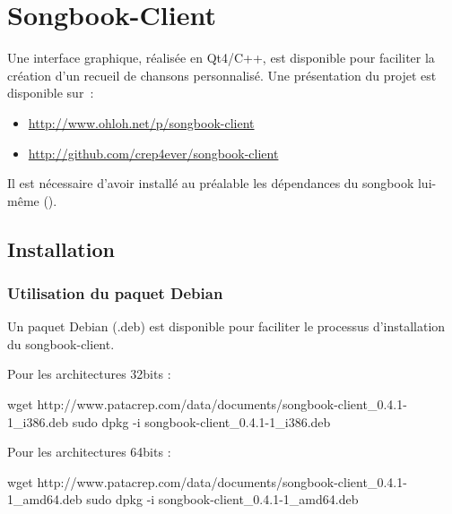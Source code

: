 \chapter{Songbook-Client}
\setcounter{chapter}{2}
\label{chap:songbook-client}
\minitoc
\newpage

Une interface graphique, réalisée en Qt4/C++, est disponible pour
faciliter la création d'un recueil de chansons personnalisé. Une
présentation du projet est disponible sur~:
\begin{itemize}
\item \url{http://www.ohloh.net/p/songbook-client}
\item \url{http://github.com/crep4ever/songbook-client}
\end{itemize}

Il est nécessaire d'avoir installé au préalable les dépendances du
songbook lui-même (). 


\section{Installation}

\subsection{Utilisation du paquet Debian}

Un paquet Debian (.deb) est disponible pour faciliter le processus
d'installation du songbook-client.

Pour les architectures 32bits :

\begin{unix}
  wget http://www.patacrep.com/data/documents/songbook-client_0.4.1-1_i386.deb
  sudo dpkg -i songbook-client_0.4.1-1_i386.deb
\end{unix}

Pour les architectures 64bits :

\begin{unix}
  wget http://www.patacrep.com/data/documents/songbook-client_0.4.1-1_amd64.deb
  sudo dpkg -i songbook-client_0.4.1-1_amd64.deb
\end{unix}


